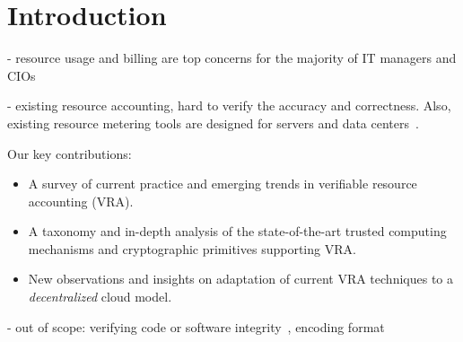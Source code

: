 \section{Introduction} \label{sect:intro}

- resource usage and billing are top concerns for the majority of IT managers and CIOs 

- existing resource accounting, hard to verify the accuracy and correctness. Also, existing resource metering tools are designed for servers and data centers~\cite{?}.

Our key contributions:
\begin{itemize}
 \item A survey of current practice and emerging trends in verifiable resource accounting (VRA).
 \item A taxonomy and in-depth analysis of the state-of-the-art trusted computing mechanisms and cryptographic primitives supporting VRA.
 \item New observations and insights on adaptation of current VRA techniques to a {\em decentralized} cloud model.
\end{itemize} 



- out of scope: verifying code or software integrity~\cite{SLS05,SMV+10}, encoding format~\cite{DJO+12}